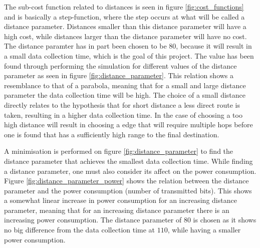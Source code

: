 
The sub-cost function related to distances is seen in figure \ref{fig:cost_functions} and is basically a step-function, where the step occurs at what will be called a distance parameter. Distances smaller than this distance parameter will have a high cost, while distances larger than the distance parameter will have no cost. The distance paramter has in part been chosen to be $80$, because it will result in a small data collection time, which is the goal of this project. The value has been found through performing the simulation for different values of the distance parameter as seen in figure \ref{fig:distance_parameter}. This relation shows a resemblance to that of a parabola, meaning that for a small and large distance parameter the data collection time will be high. The choice of a small distance directly relates to the hypothesis that for short distance a less direct route is taken, resulting in a higher data collection time. In the case of choosing a too high distance will result in choosing a edge that will require multiple hops before one is found that has a sufficiently high range to the final destination.


A minimisation is performed on figure \ref{fig:distance_parameter} to find the distance parameter that achieves the smallest data collection time. While finding a distance parameter, one must also consider its affect on the power consumption. Figure \ref{fig:distance_parameter_power} shows the relation between the distance parameter and the power consumption (number of transmitted bits). This shows a somewhat linear increase in power consumption for an increasing distance parameter, meaning that for an increasing distance parameter there is an increasing power consumption. The distance parameter of $80$ is chosen as it shows no big difference from the data collection time at $110$, while having a smaller power consumption.


